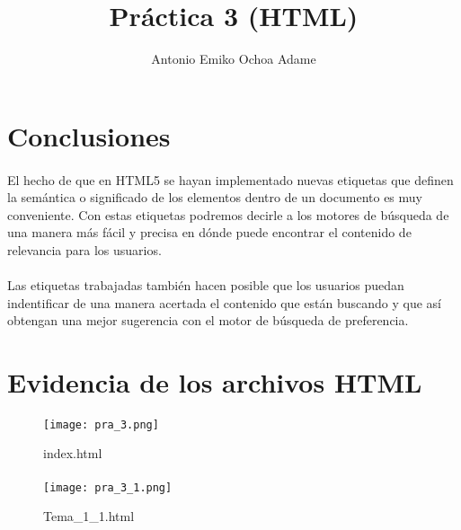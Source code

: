 \documentclass{article}
\begin{document}
\title{Práctica 3 (HTML)}
\author{Antonio Emiko Ochoa Adame}
\maketitle

\section{Conclusiones}

\paragraph{}
El hecho de que en HTML5 se hayan implementado nuevas etiquetas que definen
la semántica o significado de los elementos dentro de un documento es muy
conveniente. Con estas etiquetas podremos decirle a los motores de búsqueda de
una manera más fácil y precisa en dónde puede encontrar el contenido de
relevancia para los usuarios.

\paragraph{}
Las etiquetas trabajadas también hacen posible que los usuarios puedan
indentificar de una manera acertada el contenido que están buscando y que
así obtengan una mejor sugerencia con el motor de búsqueda de preferencia.

\section{Evidencia de los archivos HTML}

\paragraph{}
\begin{figure}
	\texttt{[image: pra\_3.png]}
	\caption{index.html}
	\label{index}
\end{figure}

\paragraph{}
\begin{figure}
	\texttt{[image: pra\_3\_1.png]}
	\caption{Tema\_1\_1.html}
	\label{tema_1}
\end{figure}
\end{document}
